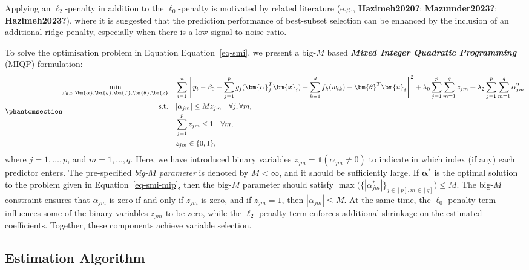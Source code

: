 \documentclass[
  11pt,
  a4paper,
]{report}
\begin{document}
Applying an \(\ell_{2}\)-penalty in addition to the \(\ell_{0}\)-penalty
is motivated by related literature (e.g., \textbf{Hazimeh2020?};
\textbf{Mazumder2023?}; \textbf{Hazimeh2023?}), where it is suggested
that the prediction performance of best-subset selection can be enhanced
by the inclusion of an additional ridge penalty, especially when there
is a low signal-to-noise ratio.

To solve the optimisation problem in Equation Equation~\ref{eq-smi}, we
present a big-\(M\) based \textbf{\emph{Mixed Integer Quadratic
Programming}} (MIQP) formulation:
\begin{equation}\phantomsection\label{eq-smi-mip}{
\begin{aligned}
  \min_{\beta_{0}, p, \bm{\alpha}, \bm{g}, \bm{f}, \bm{\theta}, \bm{z}} \quad & \sum_{i = 1}^{n}\Bigg [ y_{i} - \beta_{0} - \sum_{j = 1}^{p}{g_{j}(\bm{\alpha}_{j}^{T}\bm{x}_{i})} - \sum_{k = 1}^{d} {f_{k}(w_{ik})} - \bm{\theta}^{T}\bm{u}_{i}\Bigg ]^{2} + \lambda_{0}\sum_{j = 1}^{p}\sum_{m = 1}^{q}z_{jm} + \lambda_{2}\sum_{j = 1}^{p}\sum_{m = 1}^{q} \alpha_{jm}^{2} \\
  \text{s.t.} \quad & |\alpha_{jm}| \le Mz_{jm} \quad \forall j, \forall m, \\
  & \sum_{j = 1}^{p}z_{jm} \le 1 \quad \forall m, \\
  & z_{jm} \in \{0, 1\},
\end{aligned}
}\end{equation} where \(j = 1, \dots, p\), and \(m = 1, \dots, q\).
Here, we have introduced binary variables
\(z_{jm} = \mathbb{1}(\alpha_{jm} \neq 0)\) to indicate in which index
(if any) each predictor enters. The pre-specified \emph{big-\(M\)
parameter} is denoted by \(M < \infty\), and it should be sufficiently
large. If \(\bm{\alpha^{*}}\) is the optimal solution to the problem
given in Equation~\ref{eq-smi-mip}, then the big-\(M\) parameter should
satisfy
\(\max \big ( \{|\alpha_{jm}^{*} |\}_{j\in[p],m\in[q]} \big) \le M\).
The big-\(M\) constraint ensures that \(\alpha_{jm}\) is zero if and
only if \(z_{jm}\) is zero, and if \(z_{jm} = 1\), then
\(|\alpha_{jm}| \le M\). At the same time, the \(\ell_{0}\)-penalty term
influences some of the binary variables \(z_{jm}\) to be zero, while the
\(\ell_{2}\)-penalty term enforces additional shrinkage on the estimated
coefficients. Together, these components achieve variable selection.

\subsection{Estimation Algorithm}\label{estimation-algorithm}
\end{document}
